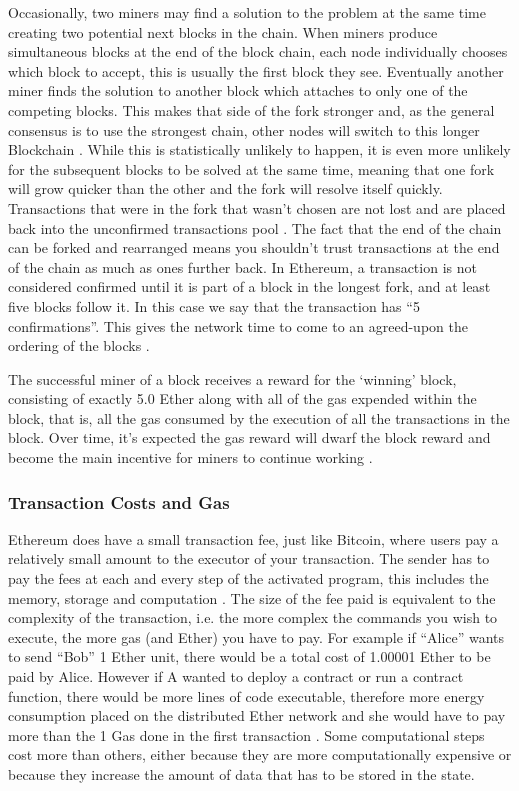 \documentclass{article}
\begin{document}
Occasionally, two miners may find a solution to the problem at the same time creating two potential next blocks in the chain. When miners produce simultaneous blocks at the end of the block chain, each node individually chooses which block to accept, this is usually the first block they see. Eventually another miner finds the solution to another block which attaches to only one of the competing blocks. This makes that side of the fork stronger and, as the general consensus is to use the strongest chain, other nodes will switch to this longer Blockchain \citep{20_developer_guide_bitcoin_2016}. While this is statistically unlikely to happen, it is even more unlikely for the subsequent blocks to be solved at the same time, meaning that one fork will grow quicker than the other and the fork will resolve itself quickly. Transactions that were in the fork that wasn't chosen are not lost and are placed back into the unconfirmed transactions pool \citep{4_driscoll_2016}. The fact that the end of the chain can be forked and rearranged means you shouldn't trust transactions at the end of the chain as much as ones further back. In Ethereum, a transaction is not considered confirmed until it is part of a block in the longest fork, and at least five blocks follow it. In this case we say that the transaction has ``5 confirmations''. This gives the network time to come to an agreed-upon the ordering of the blocks \citep{35_nielsen_2013}.

The successful miner of a block receives a reward for the `winning' block, consisting of exactly 5.0 Ether along with all of the gas expended within the block, that is, all the gas consumed by the execution of all the transactions in the block. Over time, it's expected the gas reward will dwarf the block reward and become the main incentive for miners to continue working \citep{57_introduction_ethereum_frontier_guide_2017}.

\subsubsection{Transaction Costs and Gas}
Ethereum does have a small transaction fee, just like Bitcoin, where users pay a relatively small amount to the executor of your transaction. The sender has to pay the fees at each and every step of the activated program, this includes the memory, storage and computation \citep{54_ethereum_explained_2017}. The size of the fee paid is equivalent to the complexity of the transaction, i.e. the more complex the commands you wish to execute, the more gas (and Ether) you have to pay. For example if ``Alice'' wants to send ``Bob'' 1 Ether unit, there would be a total cost of 1.00001 Ether to be paid by Alice. However if A wanted to deploy a contract or run a contract function, there would be more lines of code executable, therefore more energy consumption placed on the distributed Ether network and she would have to pay more than the 1 Gas done in the first transaction \citep{56_ethereum_2017}. Some computational steps cost more than others, either because they are more computationally expensive or because they increase the amount of data that has to be stored in the state. 
\end{document}
